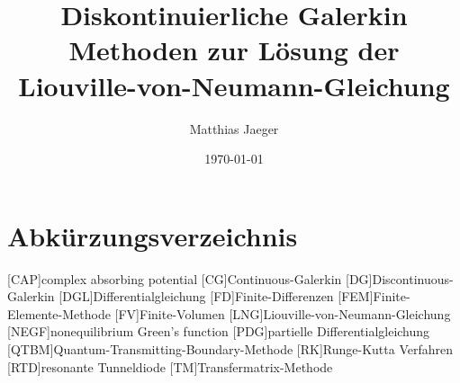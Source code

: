 \documentclass[
  tucolor,
  BCOR=12mm,     %
  parskip=half,  %
  open=any,      %
  cleardoublepage=plain,  %
]{tudothesis}
\author{Matthias Jaeger}
\title{Diskontinuierliche Galerkin Methoden zur Lösung der Liouville-von-Neumann-Gleichung}
\date{\today}
\def\blankpage{%
      \clearpage%
      \thispagestyle{empty}%
      \null%
      \clearpage}
\begin{document}
\frontmatter
\maketitle
\blankpage
\makecorrectorpage



\cleardoublepage
\tableofcontents
\clearpage \newpage
\chapter{Abkürzungsverzeichnis}
\begin{acronym}[QTBM]
  [CAP]{complex absorbing potential}
  [CG]{Continuous-Galerkin}
  [DG]{Discontinuous-Galerkin}
  [DGL]{Differentialgleichung}
  [FD]{Finite-Differenzen}
  [FEM]{Finite-Elemente-Methode}
  [FV]{Finite-Volumen}
  [LNG]{Liouville-von-Neumann-Gleichung}
  [NEGF]{nonequilibrium Green’s function}
  [PDG]{partielle Differentialgleichung}
  [QTBM]{Quantum-Transmitting-Boundary-Methode}
  [RK]{Runge-Kutta Verfahren}
  [RTD]{resonante Tunneldiode}
  [TM]{Transfermatrix-Methode}
\end{acronym}


%
\mainmatter





%
\appendix

%
\backmatter
\printbibliography
\printindex
%
\cleardoublepage

\end{document}
